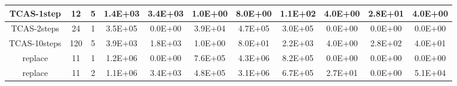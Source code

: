 \begin{table*}[]
\begin{tabular}{@{}ccccccccccc@{}}
        TCAS-1step                                               & 12                                                         & 5    & 1.4E+03                                                     & 3.4E+03                                                               & 1.0E+00                                                 & 8.0E+00                                                    & 1.1E+02                                                        & 4.0E+00                                                   & 2.8E+01                                                   & 4.0E+00 \\ \midrule
        TCAS-2steps                                              & 24                                                         & 1    & 3.5E+05                                                     & 0.0E+00                                                               & 3.9E+04                                                 & 4.7E+05                                                    & 3.0E+05                                                        & 0.0E+00                                                   & 0.0E+00                                                   & 0.0E+00 \\ \midrule
        TCAS-10steps                                             & 120                                                        & 5    & 3.9E+03                                                     & 1.8E+03                                                               & 1.0E+00                                                 & 8.0E+01                                                    & 2.2E+03                                                        & 4.0E+00                                                   & 2.8E+02                                                   & 4.0E+01 \\ \midrule \midrule
        replace                                                  & 11                                                         & 1    & 1.2E+06                                                     & 0.0E+00                                                               & 7.6E+05                                                 & 4.3E+06                                                    & 8.2E+05                                                        & 0.0E+00                                                   & 0.0E+00                                                   & 0.0E+00 \\ \midrule
        replace                                                  & 11                                                         & 2    & 1.1E+06                                                     & 3.4E+03                                                               & 4.8E+05                                                 & 3.1E+06                                                    & 6.7E+05                                                        & 2.7E+01                                                   & 0.0E+00                                                   & 5.1E+04 \\ \midrule

\end{tabular}
\end{table*}
